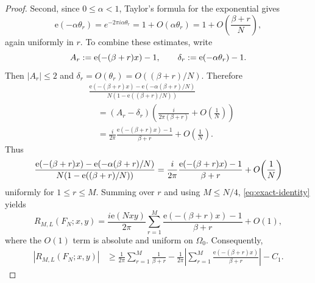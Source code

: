 \documentclass[10pt,a4paper]{amsart}
\newcommand{\et}[1]{\mathrm e\!\left(#1\right)}
\begin{document}
\begin{proof}
Second, since $0\leq \alpha <1$, Taylor's formula for the exponential gives 
\begin{equation*}
\mathrm{e}\!\left( -\alpha \theta _{r}\right) =e^{-2\pi i\alpha \theta
_{r}}=1+O(\alpha \theta _{r})=1+O\!\left( \frac{\beta +r}{N}%
\right) ,
\end{equation*}%
again uniformly in $r$. To combine these estimates, write 
\begin{equation*}
A_{r}:=\mathrm{e}\!\left( -(\beta +r)x\right) -1,\qquad \delta _{r}:=\mathrm{%
e}\!\left( -\alpha \theta _{r}\right) -1.
\end{equation*}%
Then $|A_{r}|\leq 2$ and $\delta _{r}=O(\theta _{r})=O((\beta +r)/N)$.
Therefore 
\begin{equation*}
\begin{aligned} &\frac{\et{-(\beta+r)x}-\et{-\alpha(\beta+r)/N}}
{N(1-\et{(\beta+r)/N})} \\ &\quad = (A_r-\delta_r)
\left(\frac{i}{2\pi(\beta+r)}+O\!\left(\frac1N\right)\right) \\ &\quad
=\frac{i}{2\pi}\frac{\et{-(\beta+r)x}-1}{\beta+r} +O\!\left(\frac1N\right).
\end{aligned}
\end{equation*}
Thus 
\begin{equation*}
\frac{\mathrm{e}\!\left( -(\beta +r)x\right) -\mathrm{e}\!\left( -\alpha
(\beta +r)/N\right) }{N(1-\mathrm{e}\!\left( (\beta +r)/N\right) )}=\frac{i}{%
2\pi }\frac{\mathrm{e}\!\left( -(\beta +r)x\right) -1}{\beta +r}+O\!\left( 
\frac{1}{N}\right)
\end{equation*}%
uniformly for $1\leq r\leq M$. Summing over $r$ and using $M\leq N/4$, %
\eqref{eq:exact-identity} yields 
\begin{equation}
R_{M,L}(F_{N};x,y)=\frac{i\mathrm{e}\!\left( Nxy\right) }{2\pi }%
\sum_{r=1}^{M}\frac{\mathrm{e}\!\left( -(\beta +r)x\right) -1}{\beta +r}%
+O(1),  \label{eq:R-asymptotic}
\end{equation}%
where the $O(1)$ term is absolute and uniform on $\Omega _{0}$.
Consequently, 
\begin{equation}
\begin{aligned} \left|R_{M,L}(F_N;x,y)\right| &\ge
\frac1{2\pi}\sum_{r=1}^{M}\frac1{\beta+r} -\frac1{2\pi}\left|\sum_{r=1}^{M}
\frac{\et{-(\beta+r)x}}{\beta+r}\right|-C_1. \end{aligned}
\label{eq:R-lower-start}
\end{equation}


\end{proof}
\end{document}
